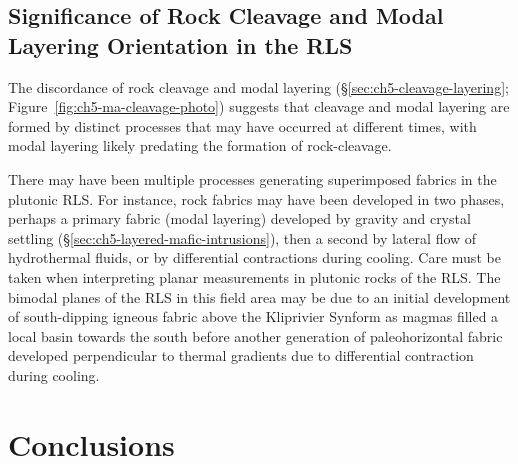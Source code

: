 \subsection{Significance of Rock Cleavage and Modal Layering Orientation in the RLS}
\label{sec:ch5-cleavage-significance}

The discordance of rock cleavage and modal layering (\S\ref{sec:ch5-cleavage-layering}; Figure~\ref{fig:ch5-ma-cleavage-photo}) suggests that cleavage and modal
layering are formed by distinct processes that may have occurred at
different times, with modal layering likely predating the formation of
rock-cleavage.



There may have been multiple processes generating superimposed fabrics
in the plutonic RLS. For instance, rock fabrics may have been developed
in two phases, perhaps a primary fabric (modal layering) developed by
gravity and crystal settling (\S\ref{sec:ch5-layered-mafic-intrusions}), then a second by lateral flow of
hydrothermal fluids, or by differential contractions during cooling.
Care must be taken when interpreting planar measurements in plutonic
rocks of the RLS. The bimodal planes of the RLS in this field area may
be due to an initial development of south-dipping igneous fabric above
the Kliprivier Synform as magmas filled a local basin towards the
south before another generation of paleohorizontal fabric developed
perpendicular to thermal gradients due to differential contraction
during cooling.

\section{Conclusions}
\label{sec:ch5-conclusions}


